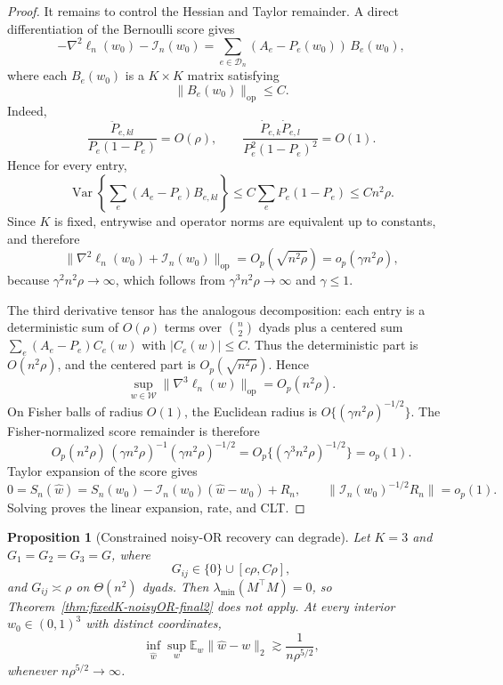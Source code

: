 \documentclass[12pt]{article}
\newtheorem{proposition}{Proposition}
\newcommand{\1}{\mathbf{1}}
\providecommand{\Var}{\operatorname{Var}}
\providecommand{\op}{\operatorname{op}}
\providecommand{\Eb}{\mathbb E}
\providecommand{\calI}{\mathcal I}
\providecommand{\calW}{\mathcal W}
\begin{document}
\begin{proof}
It remains to control the Hessian and Taylor remainder.  A direct
differentiation of the Bernoulli score gives
\[
  -\nabla^2\ell_n(w_0)-\calI_n(w_0)
  =
  \sum_{e\in\mathcal D_n}(A_e-P_e(w_0))\,B_e(w_0),
\]
where each \(B_e(w_0)\) is a \(K\times K\) matrix satisfying
\[
  \|B_e(w_0)\|_{\op}\le C.
\]
Indeed,
\[
  \frac{\ddot P_{e,kl}}{P_e(1-P_e)}=O(\rho),
  \qquad
  \frac{\dot P_{e,k}\dot P_{e,l}}{P_e^2(1-P_e)^2}=O(1).
\]
Hence for every entry,
\[
  \Var\!\left\{\sum_e(A_e-P_e)B_{e,kl}\right\}
  \le
  C\sum_eP_e(1-P_e)
  \le
  Cn^2\rho.
\]
Since \(K\) is fixed, entrywise and operator norms are equivalent up to
constants, and therefore
\[
  \|\nabla^2\ell_n(w_0)+\calI_n(w_0)\|_{\op}
  =
  O_p(\sqrt{n^2\rho})
  =
  o_p(\gamma n^2\rho),
\]
because \(\gamma^2n^2\rho\to\infty\), which follows from
\(\gamma^3n^2\rho\to\infty\) and \(\gamma\le1\).

The third derivative tensor has the analogous decomposition: each entry
is a deterministic sum of \(O(\rho)\) terms over \(\binom{n}{2}\) dyads plus a
centered sum \(\sum_e(A_e-P_e)C_e(w)\) with \(|C_e(w)|\le C\).  Thus the
deterministic part is \(O(n^2\rho)\), and the centered part is
\(O_p(\sqrt{n^2\rho})\).  Hence
\[
  \sup_{w\in\calW}\|\nabla^3\ell_n(w)\|_{\op}
  =
  O_p(n^2\rho).
\]
On Fisher balls of radius \(O(1)\), the Euclidean radius is
\(O\{(\gamma n^2\rho)^{-1/2}\}\).  The Fisher-normalized score remainder
is therefore
\[
  O_p(n^2\rho)\,(\gamma n^2\rho)^{-1}
  (\gamma n^2\rho)^{-1/2}
  =
  O_p\{(\gamma^3n^2\rho)^{-1/2}\}
  =
  o_p(1).
\]
Taylor expansion of the score gives
\[
  0=S_n(\widehat w)
  =
  S_n(w_0)-\calI_n(w_0)(\widehat w-w_0)+R_n,
  \qquad
  \|\calI_n(w_0)^{-1/2}R_n\|=o_p(1).
\]
Solving proves the linear expansion, rate, and CLT.
\end{proof}

\begin{proposition}[Constrained noisy-OR recovery can degrade]
\label{prop:noisyOR-degrade-final2}
Let \(K=3\) and \(G_1=G_2=G_3=G\), where
\[
  G_{ij}\in\{0\}\cup[c\rho,C\rho],
\]
and \(G_{ij}\asymp\rho\) on \(\Theta(n^2)\) dyads.  Then
\(\lambda_{\min}(M^\top M)=0\), so
Theorem~\ref{thm:fixedK-noisyOR-final2} does not apply.  At every
interior \(w_0\in(0,1)^3\) with distinct coordinates,
\[
  \inf_{\widehat w}\sup_w
  \Eb_w\|\widehat w-w\|_2
  \gtrsim
  \frac{1}{n\rho^{5/2}},
\]
whenever \(n\rho^{5/2}\to\infty\).
\end{proposition}
\end{document}
